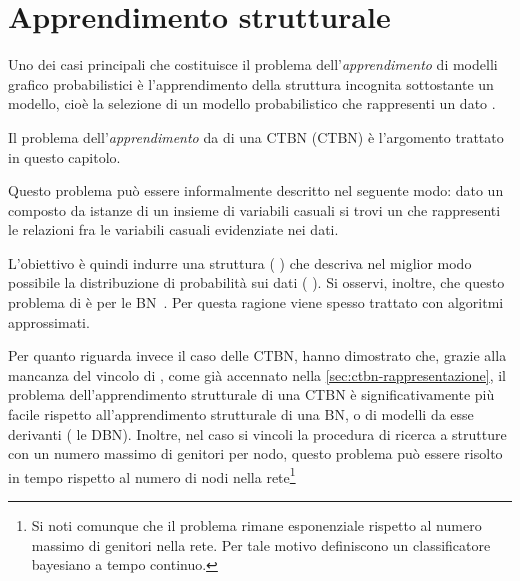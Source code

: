 
\chapter{Apprendimento strutturale}
\label{cap:structurallearning}
Uno dei casi principali che costituisce il problema dell'\emph{apprendimento} di modelli grafico probabilistici è l'apprendimento della struttura incognita sottostante un modello, cioè la selezione di un modello probabilistico che rappresenti un dato \emph{\keyword{\trs{}}}. %

Il problema dell'\emph{apprendimento } da \emph{} di una \acl{CTBN} (\acs{CTBN}) è l'argomento trattato in questo capitolo.

Questo problema può essere informalmente descritto nel seguente modo: dato un \emph{\keyword{\trs{}}} composto da istanze di un insieme di variabili casuali si trovi un  che rappresenti le relazioni fra le variabili casuali evidenziate nei dati. %

L'obiettivo è quindi indurre una struttura (\ie{} ) che descriva nel miglior modo possibile la distribuzione di probabilità sui dati (\ie{} \emph{\keyword{\trs{}}}). Si osservi, inoltre, che questo problema di  è \emph{} per le \acl{BN}~\citep{Chickering1994,Chickering2004}. Per questa ragione viene spesso trattato con algoritmi approssimati. %

Per quanto riguarda invece il caso delle \acs{CTBN}, \citet{Nodelman2002} hanno dimostrato che, grazie alla mancanza del vincolo di , come già accennato nella \autoref{sec:ctbn-rappresentazione}, il problema dell'apprendimento strutturale di una \acs{CTBN} è significativamente più facile rispetto all'apprendimento strutturale di una \acl{BN}, o di modelli da esse derivanti (\eg{} le \acf{DBN}). Inoltre, nel caso si vincoli la procedura di ricerca a strutture con un numero massimo di genitori per nodo, questo problema può essere risolto in tempo  rispetto al numero di nodi nella rete\footnote{Si noti comunque che il problema rimane esponenziale rispetto al numero massimo di genitori nella rete. Per tale motivo \citet{Stella2012} definiscono un classificatore bayesiano a tempo continuo.}

